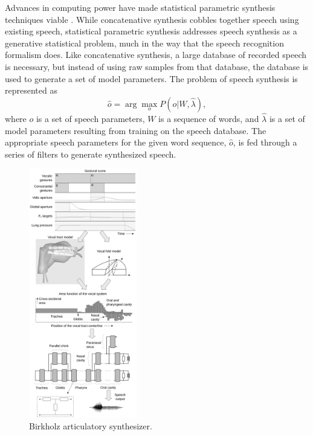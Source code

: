 \documentclass{article}
\begin{document}
Advances in computing power
have made statistical parametric synthesis
techniques viable \citep{zen2009}.
While concatenative synthesis
cobbles together speech using existing speech,
statistical parametric synthesis
addresses speech synthesis
as a generative statistical problem,
much in the way that
the speech recognition formalism does.
Like concatenative synthesis,
a large database of recorded speech is necessary,
but instead of using
raw samples from that database,
the database is used to generate
a set of model parameters.
The problem of speech synthesis
is represented as
\begin{equation}
  \hat{o} = \arg \max_o P(o|W, \hat{\lambda}),
\end{equation}
where $o$ is a set of speech parameters,
$W$ is a sequence of words,
and $\hat{\lambda}$ is a set of model parameters
resulting from training on the speech database.
The appropriate speech parameters
for the given word sequence, $\hat{o}$,
is fed through a series of filters
to generate synthesized speech.

\begin{figure}
  \vspace{-30pt}
  \begin{center}
    \includegraphics[width=0.42\textwidth]{birkholz}
  \end{center}
  \vspace{-12pt}
  \caption{Birkholz articulatory synthesizer.}
  \label{fig:birkholz}
  \vspace{-20pt}
\end{figure}
\end{document}
